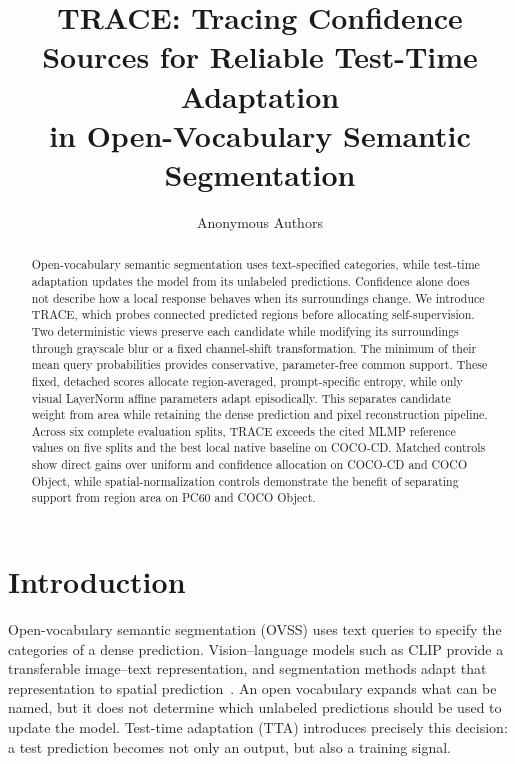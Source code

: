 \documentclass[letterpaper]{article}
\title{TRACE: Tracing Confidence Sources for Reliable Test-Time Adaptation\\in Open-Vocabulary Semantic Segmentation}
\author{Anonymous Authors}
\begin{document}
\raggedbottom
\maketitle

\begin{abstract}
Open-vocabulary semantic segmentation uses text-specified categories, while test-time adaptation updates the model from its unlabeled predictions. Confidence alone does not describe how a local response behaves when its surroundings change. We introduce TRACE, which probes connected predicted regions before allocating self-supervision. Two deterministic views preserve each candidate while modifying its surroundings through grayscale blur or a fixed channel-shift transformation. The minimum of their mean query probabilities provides conservative, parameter-free common support. These fixed, detached scores allocate region-averaged, prompt-specific entropy, while only visual LayerNorm affine parameters adapt episodically. This separates candidate weight from area while retaining the dense prediction and pixel reconstruction pipeline. Across six complete evaluation splits, TRACE exceeds the cited MLMP reference values on five splits and the best local native baseline on COCO-CD. Matched controls show direct gains over uniform and confidence allocation on COCO-CD and COCO Object, while spatial-normalization controls demonstrate the benefit of separating support from region area on PC60 and COCO Object.
\end{abstract}

\section{Introduction}
Open-vocabulary semantic segmentation (OVSS) uses text queries to specify the categories of a dense prediction. Vision--language models such as CLIP provide a transferable image--text representation, and segmentation methods adapt that representation to spatial prediction~\cite{radford2021clip,hajimiri2025naclip}. An open vocabulary expands what can be named, but it does not determine which unlabeled predictions should be used to update the model. Test-time adaptation (TTA) introduces precisely this decision: a test prediction becomes not only an output, but also a training signal.
\end{document}
